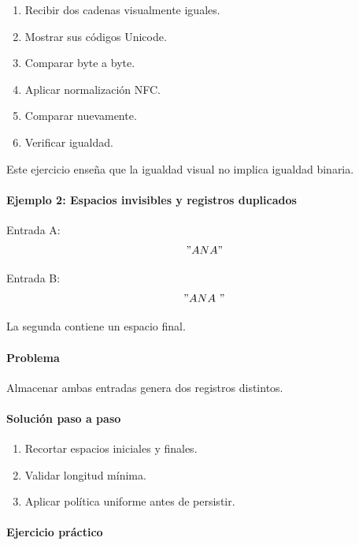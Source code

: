 \documentclass[12pt,twoside]{book}
\begin{document}
						\begin{enumerate}
							\item Recibir dos cadenas visualmente iguales.
							\item Mostrar sus códigos Unicode.
							\item Comparar byte a byte.
							\item Aplicar normalización NFC.
							\item Comparar nuevamente.
							\item Verificar igualdad.
						\end{enumerate}
						
						\noindent
						Este ejercicio enseña que la igualdad visual no implica igualdad binaria.
						
						\paragraph{Ejemplo 2: Espacios invisibles y registros duplicados}
						
						\noindent
						Entrada A:
						\[
						"ANA"
						\]
						
						Entrada B:
						\[
						"ANA\ "
						\]
						
						La segunda contiene un espacio final.
						
						\paragraph{Problema}
						
						Almacenar ambas entradas genera dos registros distintos.
						
						\paragraph{Solución paso a paso}
						
						\begin{enumerate}
							\item Recortar espacios iniciales y finales.
							\item Validar longitud mínima.
							\item Aplicar política uniforme antes de persistir.
						\end{enumerate}
						
						\paragraph{Ejercicio práctico}
						
\end{document}
